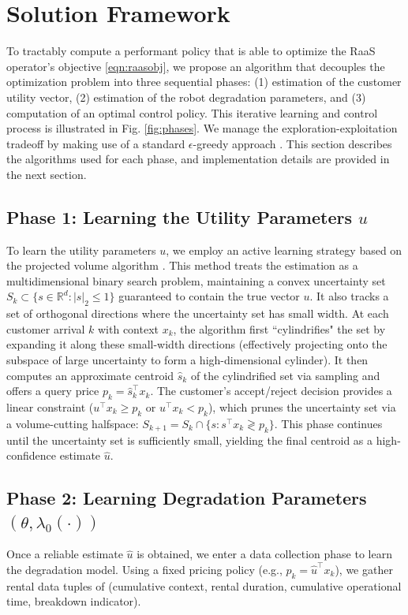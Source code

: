 \documentclass[conference]{IEEEtran}
\begin{document}
\section{Solution Framework}
\label{sec:sf}

To tractably compute a performant policy that is able to optimize the RaaS operator's objective \ref{eqn:raasobj}, we propose an algorithm that decouples the optimization problem into three sequential phases: (1) estimation of the customer utility vector, (2) estimation of the robot degradation parameters, and (3) computation of an optimal control policy. This iterative learning and control process is illustrated in Fig. \ref{fig:phases}. We manage the exploration-exploitation tradeoff by making use of a standard $\epsilon$-greedy approach \cite{dann2022guarantees}. This section describes the algorithms used for each phase, and implementation details are provided in the next section.

\subsection{Phase 1: Learning the Utility Parameters $u$}
To learn the utility parameters $u$, we employ an active learning strategy based on the projected volume algorithm \cite{scheid2024incentivized, lobel2018multidimensional}. This method treats the estimation as a multidimensional binary search problem, maintaining a convex uncertainty set $S_k \subset \{s \in \mathbb{R}^d : |s|_2 \leq 1\}$ guaranteed to contain the true vector $u$. It also tracks a set of orthogonal directions where the uncertainty set has small width. At each customer arrival $k$ with context $x_k$, the algorithm first ``cylindrifies" the set by expanding it along these small-width directions (effectively projecting onto the subspace of large uncertainty to form a high-dimensional cylinder). It then computes an approximate centroid $\widehat{s}_k$ of the cylindrified set via sampling and offers a query price $p_k = \hat s_k^\top x_k$. The customer's accept/reject decision provides a linear constraint ($u^\top x_k \geq p_k$ or $u^\top x_k < p_k$), which prunes the uncertainty set via a volume-cutting halfspace: $S_{k+1} = S_k \cap \{s : s^\top x_k \gtrless p_k\}$. This phase continues until the uncertainty set is sufficiently small, yielding the final centroid as a high-confidence estimate $\widehat{u}$.

\subsection{Phase 2: Learning Degradation Parameters $(\theta, \lambda_0(\cdot))$}
Once a reliable estimate $\widehat{u}$ is obtained, we enter a data collection phase to learn the degradation model. Using a fixed pricing policy (e.g., $p_k = \widehat{u}^\top x_k$), we gather rental data tuples of (cumulative context, rental duration, cumulative operational time, breakdown indicator).
\end{document}
